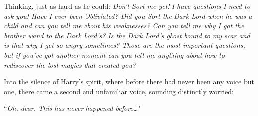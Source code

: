 Thinking, just as hard as he could: \emph{Don't Sort me yet! I have questions I need to ask you! Have I ever been Obliviated? Did you Sort the Dark Lord when he was a child and can you tell me about his weaknesses? Can you tell me why I got the brother wand to the Dark Lord's? Is the Dark Lord's ghost bound to my scar and is that why I get so angry sometimes? Those are the most important questions, but if you've got another moment can you tell me anything about how to rediscover the lost magics that created you?}

Into the silence of Harry's spirit, where before there had never been any voice but one, there came a second and unfamiliar voice, sounding distinctly worried:

``\emph{Oh, dear. This has never happened before…}"

